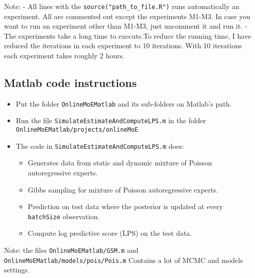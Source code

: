 \documentclass[
]{article}
\providecommand{\tightlist}{%
  \setlength{\itemsep}{0pt}\setlength{\parskip}{0pt}}
\begin{document}
Note: - All lines with the \texttt{source("path\_to\_file.R")} runs
automatically an experiment. All are commented out except the
experiments M1-M3. In case you want to run an experiment other than
M1-M3, just uncomment it and run it. - The experiments take a long time
to execute.To reduce the running time, I have reduced the iterations in
each experiment to 10 iterations. With 10 iterations each experiment
takes roughly 2 hours.

\hypertarget{matlab-code-instructions}{%
\subsection{Matlab code instructions}\label{matlab-code-instructions}}

\begin{itemize}
\item
  Put the folder \texttt{OnlineMoEMatlab} and its sub-folders on
  Matlab's path.
\item
  Run the file \texttt{SimulateEstimateAndComputeLPS.m} in the folder
  \texttt{OnlineMoEMatlab/projects/onlineMoE}
\item
  The code in \texttt{SimulateEstimateAndComputeLPS.m} does:

  \begin{itemize}
  \tightlist
  \item
    Generates data from static and dynamic mixture of Poisson
    autoregressive experts.
  \item
    Gibbs sampling for mixture of Poisson autoregressive experts.
  \item
    Prediction on test data where the posterior is updated at every
    \texttt{batchSize} observation.
  \item
    Compute log predictive score (LPS) on the test data.
  \end{itemize}
\end{itemize}

Note: the files \texttt{OnlineMoEMatlab/GSM.m} and
\texttt{OnlineMoEMatlab/models/pois/Pois.m} Contains a lot of MCMC and
models settings.
\end{document}
